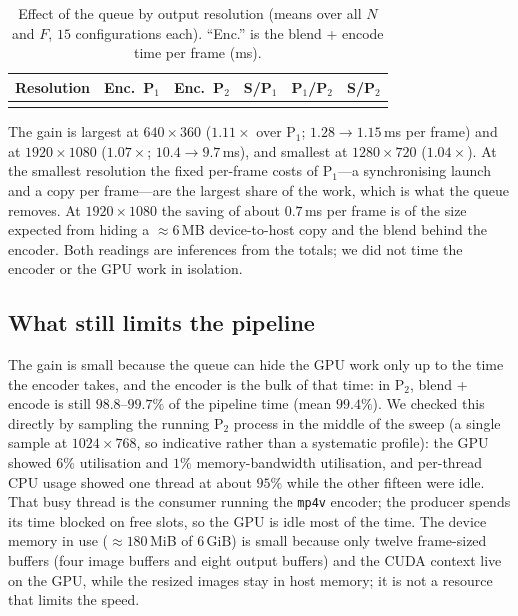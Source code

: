 \documentclass[conference]{IEEEtran}
\begin{document}
\begin{table}[t]
\caption{Effect of the queue by output resolution (means over all $N$ and $F$, $15$ configurations each). ``Enc.'' is the blend + encode time per frame (ms).}
\label{tab:queue-res}
\centering
\footnotesize
\setlength{\tabcolsep}{3.2pt}
\begin{tabular}{@{}lccccc@{}}
\toprule
Resolution & Enc.\ P$_1$ & Enc.\ P$_2$ & S/P$_1$ & P$_1$/P$_2$ & S/P$_2$ \\
\midrule
\\
\bottomrule
\end{tabular}
\end{table}

The gain is largest at $640\times360$ ($1.11\times$ over P$_1$; $1.28\to1.15$\,ms per frame) and at $1920\times1080$ ($1.07\times$; $10.4\to9.7$\,ms), and smallest at $1280\times720$ ($1.04\times$). At the smallest resolution the fixed per-frame costs of P$_1$---a synchronising launch and a copy per frame---are the largest share of the work, which is what the queue removes. At $1920\times1080$ the saving of about $0.7$\,ms per frame is of the size expected from hiding a $\approx 6$\,MB device-to-host copy and the blend behind the encoder. Both readings are inferences from the totals; we did not time the encoder or the GPU work in isolation.

\subsection{What still limits the pipeline}
The gain is small because the queue can hide the GPU work only up to the time the encoder takes, and the encoder is the bulk of that time: in P$_2$, blend + encode is still $98.8$--$99.7\%$ of the pipeline time (mean $99.4\%$). We checked this directly by sampling the running P$_2$ process in the middle of the sweep (a single sample at $1024\times768$, so indicative rather than a systematic profile): the GPU showed $6\%$ utilisation and $1\%$ memory-bandwidth utilisation, and per-thread CPU usage showed one thread at about $95\%$ while the other fifteen were idle. That busy thread is the consumer running the \texttt{mp4v} encoder; the producer spends its time blocked on free slots, so the GPU is idle most of the time. The device memory in use ($\approx 180$\,MiB of $6$\,GiB) is small because only twelve frame-sized buffers (four image buffers and eight output buffers) and the CUDA context live on the GPU, while the resized images stay in host memory; it is not a resource that limits the speed.
\end{document}
